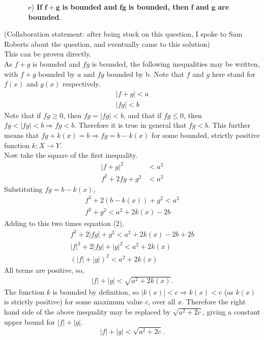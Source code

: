 \documentclass{amsart}
\begin{document}
\begin{enumerate}
    \item []
    \begin{itemize}
        \item [e)] \textbf{If }$\mathbf{f+g}$\textbf{ is bounded and }$\mathbf{fg}$\textbf{ is bounded, then }$\mathbf{f}$\textbf{ and }$\mathbf{g}$\textbf{ are bounded}.
    \end{itemize}
\end{enumerate}

(Collaboration statement: after being stuck on this question, I spoke to Sam Roberts about the question, and eventually came to this solution)
\\
This can be proven directly.\\
As $f+g$ is bounded and $fg$ is bounded, the following inequalities may be written, with $f+g$ bounded by $a$ and $fg$ bounded by b. Note that $f$ and $g$ here stand for $f(x)$ and $g(x)$ respectively.
\begin{align}
    |f+g| < a\\
    |fg| < b
\end{align}
Note that if $fg \ge 0$, then $fg = |fg| < b$, and that if $fg \le 0$, then $fg < |fg| < b \Rightarrow fg < b$. Therefore it is true in general that $fg < b$. This further means that $fg + k(x) = b\Rightarrow fg = b - k(x)$ for some bounded, strictly positive function $k:X\longrightarrow Y$.\\
Now take the square of the first inequality.
\begin{align*}
|f+g|^{2} &< a^{2}\\
f^{2} + 2fg + g^{2} &< a^{2}
\end{align*}
Substituting $fg = b - k(x)$,
\begin{align*}
f^{2} + 2(b - k(x)) + g^{2} < a^{2}\\
f^{2} + g^{2} < a^{2} + 2k(x) - 2b
\end{align*}
Adding to this two times equation (2),
\begin{align*}
f^{2} + 2|fg| + g^{2} < a^{2} + 2k(x) - 2b + 2b\\
|f|^{2} + 2|fg| + |g|^{2} < a^{2} + 2k(x)\\
(|f| + |g|)^{2} < a^{2} + 2k(x)
\end{align*}
All terms are positive, so,
\begin{align*}
|f| + |g| < \sqrt{a^{2} + 2k(x)}.
\end{align*}
The function $k$ is bounded by definition, so $|k(x)| < c\Rightarrow k(x) < c$ (as $k(x)$ is strictly positive) for some maximum value $c$, over all $x$. Therefore the right hand side of the above inequality may be replaced by $\sqrt{a^{2} + 2c}$, giving a constant upper bound for $|f| + |g|$.
$$
|f| + |g| < \sqrt{a^{2} + 2c}.
$$
\end{document}
